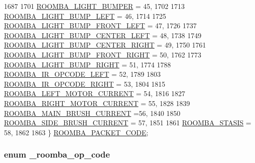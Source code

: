 \begin{DoxyCode}
1687 
1701   \hyperlink{group__roomba-lib_gga46f008b5055c4a08d3123c6a3478373ea11af024cc8c3de71acadd02c432d55ce}{ROOMBA\_LIGHT\_BUMPER} = 45,
1702 
1713   \hyperlink{group__roomba-lib_gga46f008b5055c4a08d3123c6a3478373ea7059f77010aa227d28fd5f875bcae9b1}{ROOMBA\_LIGHT\_BUMP\_LEFT} = 46,
1714 
1725   \hyperlink{group__roomba-lib_gga46f008b5055c4a08d3123c6a3478373ea309109f9c53e16a26d9d096c5c56ff71}{ROOMBA\_LIGHT\_BUMP\_FRONT\_LEFT} = 47,
1726 
1737   \hyperlink{group__roomba-lib_gga46f008b5055c4a08d3123c6a3478373ea5987a92277142efcf0ed3cabba1a1bae}{ROOMBA\_LIGHT\_BUMP\_CENTER\_LEFT} = 48,
1738 
1749   \hyperlink{group__roomba-lib_gga46f008b5055c4a08d3123c6a3478373ea6105c9a570e4b4a7e69262f113f03fe1}{ROOMBA\_LIGHT\_BUMP\_CENTER\_RIGHT} = 49,
1750 
1761   \hyperlink{group__roomba-lib_gga46f008b5055c4a08d3123c6a3478373ea94217c4da645d2bed66a8ef46485b776}{ROOMBA\_LIGHT\_BUMP\_FRONT\_RIGHT} = 50,
1762 
1773   \hyperlink{group__roomba-lib_gga46f008b5055c4a08d3123c6a3478373ead32d8a13d2506234d1358f7622725331}{ROOMBA\_LIGHT\_BUMP\_RIGHT} = 51,
1774 
1788   \hyperlink{group__roomba-lib_gga46f008b5055c4a08d3123c6a3478373ea9ebd0d5b7b0d25ab79377208546ed5bd}{ROOMBA\_IR\_OPCODE\_LEFT} = 52,
1789 
1803   \hyperlink{group__roomba-lib_gga46f008b5055c4a08d3123c6a3478373eaea5b0df07c05b451fc103c732c6e74eb}{ROOMBA\_IR\_OPCODE\_RIGHT} = 53,
1804 
1815   \hyperlink{group__roomba-lib_gga46f008b5055c4a08d3123c6a3478373eaeadd154f9f2f7647caf3488d27bd4fef}{ROOMBA\_LEFT\_MOTOR\_CURRENT} = 54,
1816 
1827   \hyperlink{group__roomba-lib_gga46f008b5055c4a08d3123c6a3478373ea7a02b4928368639e9bd9fcec9656462b}{ROOMBA\_RIGHT\_MOTOR\_CURRENT} = 55,
1828 
1839   \hyperlink{group__roomba-lib_gga46f008b5055c4a08d3123c6a3478373ea31137d3179ccc5981923bd6aa8b63b95}{ROOMBA\_MAIN\_BRUSH\_CURRENT} =56,
1840 
1850   \hyperlink{group__roomba-lib_gga46f008b5055c4a08d3123c6a3478373ea7c8ef5075b9ed0f0d6699c83d6359952}{ROOMBA\_SIDE\_BRUSH\_CURRENT} = 57,
1851 
1861   \hyperlink{group__roomba-lib_gga46f008b5055c4a08d3123c6a3478373ea0e892ee610c71a2a567e51ecd5d1e043}{ROOMBA\_STASIS} = 58,
1862 
1863 \} \hyperlink{group__roomba-lib_gada33faf3aeb650fa045d8516c6257174}{ROOMBA\_PACKET\_CODE};
\end{DoxyCode}
\hypertarget{group__roomba-lib_ga305e17dfb7050ad83ea49ded2e6a2e24}{}
\subsubsection[{\+\_\+roomba\+\_\+op\+\_\+code}]{\setlength{\rightskip}{0pt plus 5cm}enum {\bf \+\_\+roomba\+\_\+op\+\_\+code}}\label{group__roomba-lib_ga305e17dfb7050ad83ea49ded2e6a2e24}


